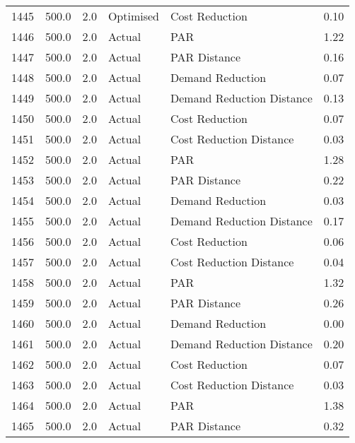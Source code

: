\begin{longtable}{lrrllr}
1445 &        500.0 &     2.0 &      Optimised &             Cost Reduction &   0.10 \\
1446 &        500.0 &     2.0 &         Actual &                        PAR &   1.22 \\
1447 &        500.0 &     2.0 &         Actual &               PAR Distance &   0.16 \\
1448 &        500.0 &     2.0 &         Actual &           Demand Reduction &   0.07 \\
1449 &        500.0 &     2.0 &         Actual &  Demand Reduction Distance &   0.13 \\
1450 &        500.0 &     2.0 &         Actual &             Cost Reduction &   0.07 \\
1451 &        500.0 &     2.0 &         Actual &    Cost Reduction Distance &   0.03 \\
1452 &        500.0 &     2.0 &         Actual &                        PAR &   1.28 \\
1453 &        500.0 &     2.0 &         Actual &               PAR Distance &   0.22 \\
1454 &        500.0 &     2.0 &         Actual &           Demand Reduction &   0.03 \\
1455 &        500.0 &     2.0 &         Actual &  Demand Reduction Distance &   0.17 \\
1456 &        500.0 &     2.0 &         Actual &             Cost Reduction &   0.06 \\
1457 &        500.0 &     2.0 &         Actual &    Cost Reduction Distance &   0.04 \\
1458 &        500.0 &     2.0 &         Actual &                        PAR &   1.32 \\
1459 &        500.0 &     2.0 &         Actual &               PAR Distance &   0.26 \\
1460 &        500.0 &     2.0 &         Actual &           Demand Reduction &   0.00 \\
1461 &        500.0 &     2.0 &         Actual &  Demand Reduction Distance &   0.20 \\
1462 &        500.0 &     2.0 &         Actual &             Cost Reduction &   0.07 \\
1463 &        500.0 &     2.0 &         Actual &    Cost Reduction Distance &   0.03 \\
1464 &        500.0 &     2.0 &         Actual &                        PAR &   1.38 \\
1465 &        500.0 &     2.0 &         Actual &               PAR Distance &   0.32 \\

\end{longtable}
